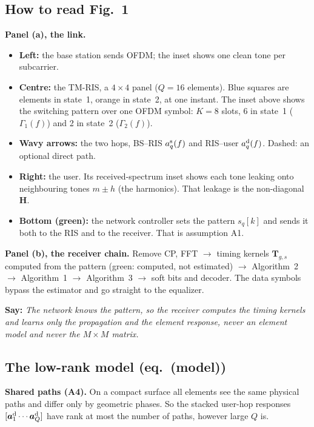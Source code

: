 \documentclass[11pt,a4paper]{article}
\newcommand{\say}[1]{\begin{keybox}\textbf{Say:} \emph{#1}\end{keybox}}
\begin{document}
\subsection{How to read Fig.~1}
\textbf{Panel (a), the link.}
\begin{itemize}
\item \textbf{Left:} the base station sends OFDM; the inset shows one clean tone per subcarrier.
\item \textbf{Centre:} the TM-RIS, a $4\times4$ panel ($Q=16$ elements). Blue squares are elements in state~1, orange in
state~2, at one instant. The inset above shows the switching pattern over one OFDM symbol: $K=8$ slots, 6 in state~1
($\Gamma_1(f)$) and 2 in state~2 ($\Gamma_2(f)$).
\item \textbf{Wavy arrows:} the two hops, BS--RIS $a^{\rm s}_q(f)$ and RIS--user $a^{\rm d}_q(f)$. Dashed: an optional
direct path.
\item \textbf{Right:} the user. Its received-spectrum inset shows each tone leaking onto neighbouring tones $m\pm h$ (the
harmonics). That leakage is the non-diagonal $\bm H$.
\item \textbf{Bottom (green):} the network controller sets the pattern $s_q[k]$ and sends it both to the RIS and to the
receiver. That is assumption A1.
\end{itemize}
\textbf{Panel (b), the receiver chain.} Remove CP, FFT $\to$ timing kernels $\bm T_{g,s}$ computed from the pattern (green:
computed, not estimated) $\to$ Algorithm~2 $\to$ Algorithm~1 $\to$ Algorithm~3 $\to$ soft bits and decoder. The data
symbols bypass the estimator and go straight to the equalizer.
\say{The network knows the pattern, so the receiver computes the timing kernels and learns only the propagation and the
element response, never an element model and never the $M\times M$ matrix.}

\subsection{The low-rank model (eq.~(model))}
\textbf{Shared paths (A4).} On a compact surface all elements see the same physical paths and differ only by geometric
phases. So the stacked user-hop responses $[\bm a^{\rm d}_1\cdots\bm a^{\rm d}_Q]$ have rank at most the number of paths,
however large $Q$ is.
\end{document}
